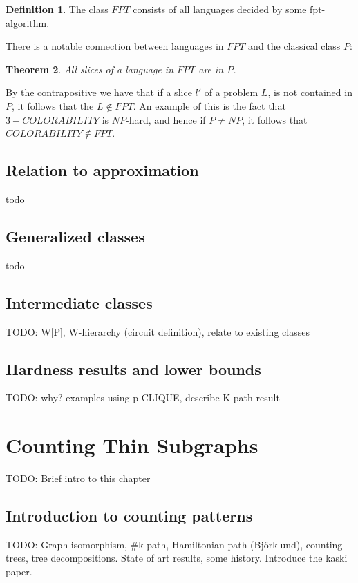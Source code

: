 \documentclass[a4paper,11pt,notitlepage]{report}
\theoremstyle{plain}
\newtheorem{thm}{Theorem}[chapter] %
\theoremstyle{definition}
\newtheorem{defn}[thm]{Definition} %
\begin{document}
\begin{defn}
The class $FPT$ consists of all languages decided by some fpt-algorithm.
\end{defn}


There is a notable connection between languages in $FPT$ and the classical class $P$:

\begin{thm}
All slices of a language in $FPT$ are in $P$.
\end{thm}

By the contrapositive we have that if a slice $l'$ of a problem $L$, is not contained in $P$, it follows that the $L \not \in FPT$.
An example of this is the fact that $3-COLORABILITY$ is $NP$-hard, and hence if $P \not = NP$, it follows that $COLORABILITY \not \in FPT$.

\section{Relation to approximation}
todo

\section{Generalized classes}
todo

\section{Intermediate classes}
TODO: W[P], W-hierarchy (circuit definition), relate to existing classes

\section{Hardness results and lower bounds}
TODO: why? examples using p-CLIQUE, describe K-path result


\chapter{Counting Thin Subgraphs}
TODO: Brief intro to this chapter

\section{Introduction to counting patterns}
TODO: Graph isomorphism, \#k-path, Hamiltonian path (Björklund), counting trees, tree decompositions.
State of art results, some history.
Introduce the kaski paper.
\end{document}
